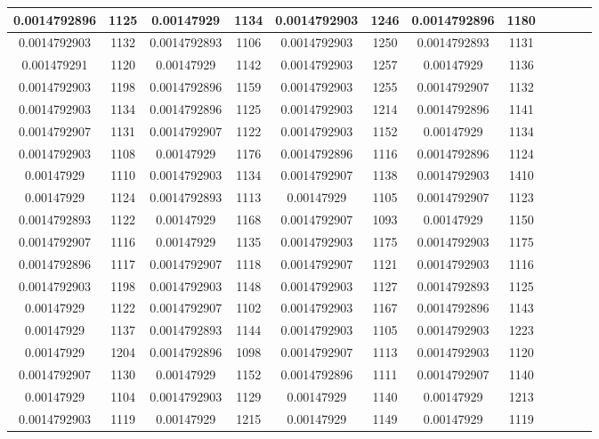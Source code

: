 \begin {table}[h]
\begin{tabular}{|c|c|c|c|c|c|c|c|c|c|c|c|}
\midrule
0.0014792896&1125&0.00147929&1134&0.0014792903&1246&0.0014792896&1180\\
\midrule
0.0014792903&1132&0.0014792893&1106&0.0014792903&1250&0.0014792893&1131\\
\midrule
0.001479291&1120&0.00147929&1142&0.0014792903&1257&0.00147929&1136\\
\midrule
0.0014792903&1198&0.0014792896&1159&0.0014792903&1255&0.0014792907&1132\\
\midrule
0.0014792903&1134&0.0014792896&1125&0.0014792903&1214&0.0014792896&1141\\
\midrule
0.0014792907&1131&0.0014792907&1122&0.0014792903&1152&0.00147929&1134\\
\midrule
0.0014792903&1108&0.00147929&1176&0.0014792896&1116&0.0014792896&1124\\
\midrule
0.00147929&1110&0.0014792903&1134&0.0014792907&1138&0.0014792903&1410\\
\midrule
0.00147929&1124&0.0014792893&1113&0.00147929&1105&0.0014792907&1123\\
\midrule
0.0014792893&1122&0.00147929&1168&0.0014792907&1093&0.00147929&1150\\
\midrule
0.0014792907&1116&0.00147929&1135&0.0014792903&1175&0.0014792903&1175\\
\midrule
0.0014792896&1117&0.0014792907&1118&0.0014792907&1121&0.0014792903&1116\\
\midrule
0.0014792903&1198&0.0014792903&1148&0.0014792903&1127&0.0014792893&1125\\
\midrule
0.00147929&1122&0.0014792907&1102&0.0014792903&1167&0.0014792896&1143\\
\midrule
0.00147929&1137&0.0014792893&1144&0.0014792903&1105&0.0014792903&1223\\
\midrule
0.00147929&1204&0.0014792896&1098&0.0014792907&1113&0.0014792903&1120\\
\midrule
0.0014792907&1130&0.00147929&1152&0.0014792896&1111&0.0014792907&1140\\
\midrule
0.00147929&1104&0.0014792903&1129&0.00147929&1140&0.00147929&1213\\
\midrule
0.0014792903&1119&0.00147929&1215&0.00147929&1149&0.00147929&1119\\
\midrule
\end{tabular}
 \end {table}

